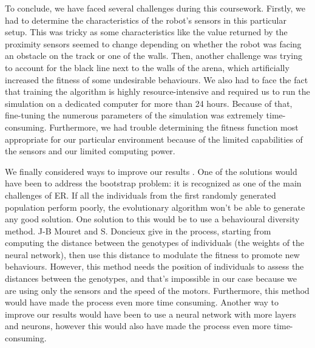 \documentclass[lettersize,journal]{IEEEtran}
\begin{document}
\par
To conclude, we have faced several challenges during this coursework. Firstly, we had to determine the characteristics of the robot's sensors in this particular setup. This was tricky as some characteristics like the value returned by the proximity sensors seemed to change depending on whether the robot was facing an obstacle on the track or one of the walls. Then, another challenge was trying to account for the black line next to the walls of the arena, which artificially increased the fitness of some undesirable behaviours. We also had to face the fact that training the algorithm is highly resource-intensive and required us to run the simulation on a dedicated computer for more than 24 hours. Because of that, fine-tuning the numerous parameters of the simulation was extremely time-consuming. Furthermore, we had trouble determining the fitness function most appropriate for our particular environment because of the limited capabilities of the sensors and our limited computing power.
\par
We finally considered ways to improve our results \cite{ref9}. One of the solutions would have been to address the bootstrap problem: it is recognized as one of the main challenges of ER. If all the individuals from the first randomly generated population perform poorly, the evolutionary algorithm won't be able to generate any good solution. 
One solution to this would be to use a behavioural diversity method. J-B Mouret and S. Doncieux give in \cite{ref9} the process, starting from computing the distance between the genotypes of individuals (the weights of the neural network), then use this distance to modulate the fitness to promote new behaviours. However, this method needs the position of individuals to assess the distances between the genotypes, and that's impossible in our case because we are using only the sensors and the speed of the motors. Furthermore, this method would have made the process even more time consuming.
Another way to improve our results would have been to use a neural network with more layers and neurons, however this would also have made the process even more time-consuming.
\end{document}
